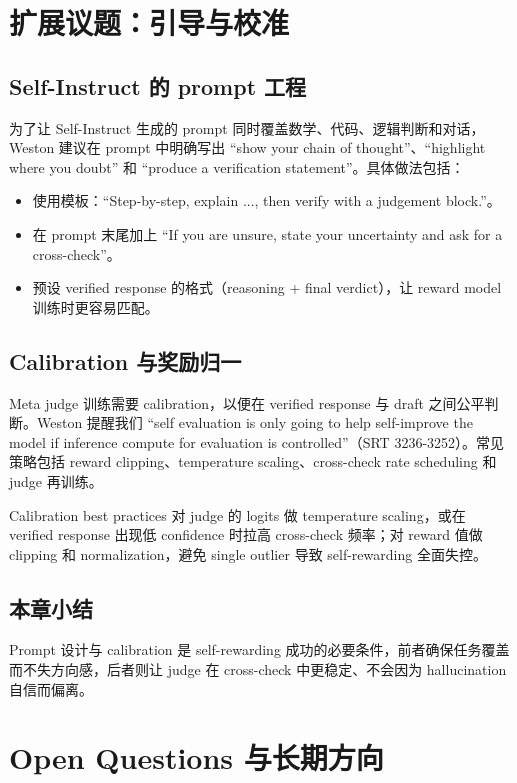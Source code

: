 \documentclass[a4paper]{article}
\begin{document}
\section{扩展议题：引导与校准}
\subsection{Self-Instruct 的 prompt 工程}
为了让 Self-Instruct 生成的 prompt 同时覆盖数学、代码、逻辑判断和对话，Weston 建议在 prompt 中明确写出 ``show your chain of thought''、``highlight where you doubt'' 和 ``produce a verification statement''。具体做法包括：
\begin{itemize}
    \item 使用模板：``Step-by-step, explain ..., then verify with a judgement block.''。
    \item 在 prompt 末尾加上 ``If you are unsure, state your uncertainty and ask for a cross-check''。
    \item 预设 verified response 的格式（reasoning + final verdict），让 reward model 训练时更容易匹配。
\end{itemize}
\mbox{}

\subsection{Calibration 与奖励归一}
Meta judge 训练需要 calibration，以便在 verified response 与 draft 之间公平判断。Weston 提醒我们 ``self evaluation is only going to help self-improve the model if inference compute for evaluation is controlled''（SRT 3236-3252）。常见策略包括 reward clipping、temperature scaling、cross-check rate scheduling 和 judge 再训练。

\begin{knowledgebox}{Calibration best practices}
对 judge 的 logits 做 temperature scaling，或在 verified response 出现低 confidence 时拉高 cross-check 频率；对 reward 值做 clipping 和 normalization，避免 single outlier 导致 self-rewarding 全面失控。
\end{knowledgebox}

\subsection{本章小结}
Prompt 设计与 calibration 是 self-rewarding 成功的必要条件，前者确保任务覆盖而不失方向感，后者则让 judge 在 cross-check 中更稳定、不会因为 hallucination 自信而偏离。

\section{Open Questions 与长期方向}
\end{document}
